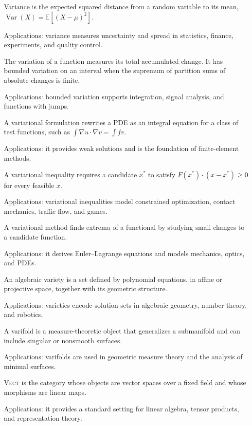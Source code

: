 Variance is the expected squared distance from a random variable to its mean, $\operatorname{Var}(X)=\mathbb E[(X-\mu)^2]$. \par\noindent Applications: variance measures uncertainty and spread in statistics, finance, experiments, and quality control.

The variation of a function measures its total accumulated change. It has bounded variation on an interval when the supremum of partition sums of absolute changes is finite. \par\noindent Applications: bounded variation supports integration, signal analysis, and functions with jumps.

A variational formulation rewrites a PDE as an integral equation for a class of test functions, such as $\int\nabla u\cdot\nabla v=\int fv$. \par\noindent Applications: it provides weak solutions and is the foundation of finite-element methods.

A variational inequality requires a candidate $x^*$ to satisfy $F(x^*)\cdot(x-x^*)\geq0$ for every feasible $x$. \par\noindent Applications: variational inequalities model constrained optimization, contact mechanics, traffic flow, and games.

A variational method finds extrema of a functional by studying small changes to a candidate function. \par\noindent Applications: it derives Euler--Lagrange equations and models mechanics, optics, and PDEs.

An algebraic variety is a set defined by polynomial equations, in affine or projective space, together with its geometric structure. \par\noindent Applications: varieties encode solution sets in algebraic geometry, number theory, and robotics.

A varifold is a measure-theoretic object that generalizes a submanifold and can include singular or nonsmooth surfaces. \par\noindent Applications: varifolds are used in geometric measure theory and the analysis of minimal surfaces.

\textsc{Vect} is the category whose objects are vector spaces over a fixed field and whose morphisms are linear maps. \par\noindent Applications: it provides a standard setting for linear algebra, tensor products, and representation theory.

